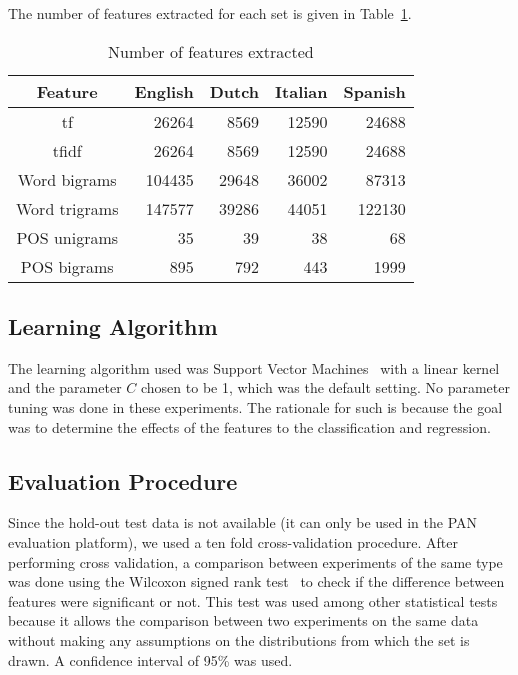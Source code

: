 \documentclass[a4paper]{llncs}
\begin{document}
The number of features extracted for each set is given in Table~\ref{table:numFeatures}.
\begin{table}[!htbp]
  \centering
  \caption{Number of features extracted}
  \label{table:numFeatures}
  \begin{tabular}{crrrr}
    \toprule
    Feature       & English & Dutch & Italian & Spanish \\
    \midrule
    tf            & 26264   & 8569  & 12590   & 24688   \\ %
    tfidf         & 26264   & 8569  & 12590   & 24688   \\ %
    Word bigrams  & 104435  & 29648 & 36002   & 87313   \\ %
    Word trigrams & 147577  & 39286 & 44051   & 122130  \\ %
    POS unigrams  & 35      & 39    & 38      & 68      \\ %
    POS bigrams   & 895     & 792   & 443     & 1999    \\ 
    \bottomrule
  \end{tabular}
\end{table}




\subsection{Learning Algorithm}
The learning algorithm used was Support Vector Machines~\cite{cortes1995support} with a linear kernel and the parameter $C$ chosen to be 1, which was the default setting. No parameter tuning was done in these experiments. The rationale for such is because the goal was to determine the effects of the features to the classification and regression.  

\subsection{Evaluation Procedure}

Since the hold-out test data is not available (it can only be used in the PAN evaluation platform), we used a ten fold cross-validation procedure. After performing cross validation, a comparison between experiments of the same type was done using the Wilcoxon signed rank test~\cite{wilcoxon1945individual} to check if the difference between features were significant or not. This test was used among  other statistical tests because it allows the comparison between two experiments  on the same data without making any assumptions on the distributions from which the set is drawn. A confidence interval of 95\% was used.
\end{document}
